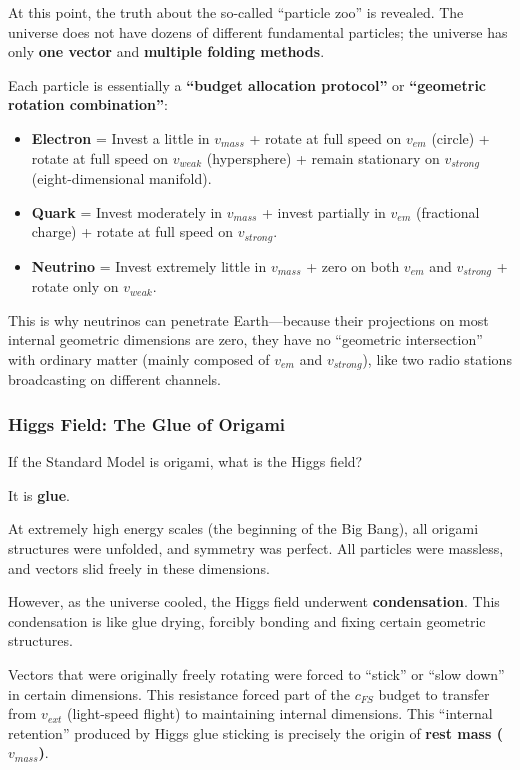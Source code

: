 At this point, the truth about the so-called ``particle zoo'' is revealed. The universe does not have dozens of different fundamental particles; the universe has only \textbf{one vector} and \textbf{multiple folding methods}.

Each particle is essentially a \textbf{``budget allocation protocol''} or \textbf{``geometric rotation combination''}:

\begin{itemize}
\item \textbf{Electron} = Invest a little in $v_{mass}$ + rotate at full speed on $v_{em}$ (circle) + rotate at full speed on $v_{weak}$ (hypersphere) + remain stationary on $v_{strong}$ (eight-dimensional manifold).

\item \textbf{Quark} = Invest moderately in $v_{mass}$ + invest partially in $v_{em}$ (fractional charge) + rotate at full speed on $v_{strong}$.

\item \textbf{Neutrino} = Invest extremely little in $v_{mass}$ + zero on both $v_{em}$ and $v_{strong}$ + rotate only on $v_{weak}$.
\end{itemize}

This is why neutrinos can penetrate Earth---because their projections on most internal geometric dimensions are zero, they have no ``geometric intersection'' with ordinary matter (mainly composed of $v_{em}$ and $v_{strong}$), like two radio stations broadcasting on different channels.

\subsubsection{Higgs Field: The Glue of Origami}

If the Standard Model is origami, what is the Higgs field?

It is \textbf{glue}.

At extremely high energy scales (the beginning of the Big Bang), all origami structures were unfolded, and symmetry was perfect. All particles were massless, and vectors slid freely in these dimensions.

However, as the universe cooled, the Higgs field underwent \textbf{condensation}. This condensation is like glue drying, forcibly bonding and fixing certain geometric structures.

Vectors that were originally freely rotating were forced to ``stick'' or ``slow down'' in certain dimensions. This resistance forced part of the $c_{FS}$ budget to transfer from $v_{ext}$ (light-speed flight) to maintaining internal dimensions. This ``internal retention'' produced by Higgs glue sticking is precisely the origin of \textbf{rest mass ($v_{mass}$)}.

